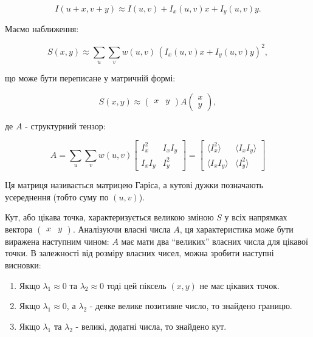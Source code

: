 \begin{equation}
  I(u+x,v+y) \approx I(u,v) + I_x(u,v)x+I_y(u,v)y .
\end{equation}

Маємо наближення:

\begin{equation}
  S(x,y) \approx \sum_u \sum_v w(u,v) \, \left( I_x(u,v)x + I_y(u,v)y \right)^2, 
\end{equation}

що може бути переписане у матричній формі:
    
\begin{equation}
  S(x,y) \approx 
  \begin{pmatrix} 
    x & y 
  \end{pmatrix} 
  A 
  \begin{pmatrix} 
    x \\ y 
  \end{pmatrix}, 
\end{equation}

де $A$ - структурний тензор:
    
\begin{equation}
  A = \sum_u \sum_v w(u,v) 
  \begin{bmatrix}
    I_x^2   & I_x I_y \\
    I_x I_y & I_y^2
  \end{bmatrix}
  = 
  \begin{bmatrix} 
    \langle I_x^2 \rangle   & \langle I_x I_y \rangle \\
    \langle I_x I_y \rangle & \langle I_y^2 \rangle 
  \end{bmatrix}
\end{equation}

Ця матриця називається матрицею Гаріса, а кутові дужки позначають усереднення (тобто суму по $(u,v)$).

Кут, або цікава точка, характеризується великою зміною $S$ у всіх напрямках вектора
$\begin{pmatrix} x & y \end{pmatrix}$. Аналізуючи власні числа $A$, ця характеристика може бути виражена наступним чином: $A$ має мати два ``великих'' власних числа для цікавої точки. В залежності від розміру власних чисел, можна зробити наступні висновки:
  \begin{enumerate}
    \item Якщо $\lambda_1 \approx 0$ та $\lambda_2 \approx 0$ тоді цей піксель $(x,y)$ не має цікавих точок.
    \item Якщо $\lambda_1 \approx 0$, а $\lambda_2$ - деяке велике позитивне число, то знайдено границю.
    \item Якщо $\lambda_1$ та $\lambda_2$ - великі, додатні числа, то знайдено кут.
  \end{enumerate}

